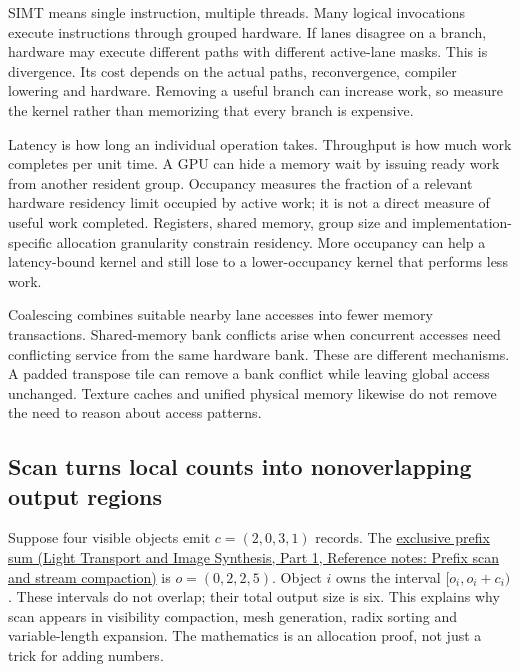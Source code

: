 SIMT means single instruction, multiple threads. Many logical invocations execute instructions through grouped hardware. If lanes disagree on a branch, hardware may execute different paths with different active-lane masks. This is divergence. Its cost depends on the actual paths, reconvergence, compiler lowering and hardware. Removing a useful branch can increase work, so measure the kernel rather than memorizing that every branch is expensive.

Latency is how long an individual operation takes. Throughput is how much work completes per unit time. A GPU can hide a memory wait by issuing ready work from another resident group. Occupancy measures the fraction of a relevant hardware residency limit occupied by active work; it is not a direct measure of useful work completed. Registers, shared memory, group size and implementation-specific allocation granularity constrain residency. More occupancy can help a latency-bound kernel and still lose to a lower-occupancy kernel that performs less work.

Coalescing combines suitable nearby lane accesses into fewer memory transactions. Shared-memory bank conflicts arise when concurrent accesses need conflicting service from the same hardware bank. These are different mechanisms. A padded transpose tile can remove a bank conflict while leaving global access unchanged. Texture caches and unified physical memory likewise do not remove the need to reason about access patterns.

\subsection{Scan turns local counts into nonoverlapping output regions}\label{01-foundations-i-ch008-scan-turns-local-counts-into-nonoverlapping-output-regions}

\hypertarget{01-foundations-i-ch008-scan-turns-local-counts-into-nonoverlapping-output-regions}{}

Suppose four visible objects emit \(c=(2,0,3,1)\) records. The \href{../04-Light-Transport-and-Image-Synthesis-P01/main.pdf\#appendix-f2ee4d086415}{exclusive prefix sum (Light Transport and Image Synthesis, Part 1, Reference notes: Prefix scan and stream compaction)} is \(o=(0,2,2,5)\). Object \(i\) owns the interval \([o_i,o_i+c_i)\). These intervals do not overlap; their total output size is six. This explains why scan appears in visibility compaction, mesh generation, radix sorting and variable-length expansion. The mathematics is an allocation proof, not just a trick for adding numbers.

